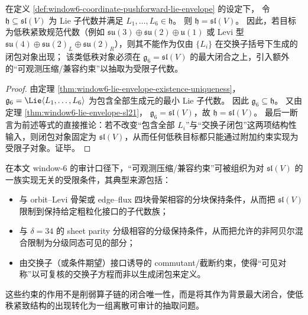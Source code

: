 \begin{proposition}\label{prop:window6-lowrank-needs-observable-compression}
在定义 \ref{def:window6-coordinate-pushforward-lie-envelope} 的设定下，
令 \(\mathfrak h\subseteq \mathfrak{sl}(V)\) 为 Lie 子代数并满足 \(L_1,\dots,L_6\in\mathfrak h\)。
则 \(\mathfrak h=\mathfrak{sl}(V)\)。
因此，若目标为低秩紧致规范代数（例如 \(\mathfrak{su}(3)\oplus\mathfrak{su}(2)\oplus\mathfrak u(1)\) 或 Levi 型 \(\mathfrak{su}(4)\oplus\mathfrak{su}(2)_L\oplus\mathfrak{su}(2)_R\)），则其不能作为仅由 \(\{L_i\}\) 在交换子括号下生成的闭包对象出现；
该类低秩对象必须在 \(\mathfrak g_6=\mathfrak{sl}(V)\) 的最大闭合之上，引入额外的“可观测压缩/兼容约束”以抽取为受限子代数。
\end{proposition}
\begin{proof}
由定理 \ref{thm:window6-lie-envelope-existence-uniqueness}，
\(\mathfrak g_6=\Lie\langle L_1,\dots,L_6\rangle\) 为包含全部生成元的最小 Lie 子代数。
因此 \(\mathfrak g_6\subseteq \mathfrak h\)。
又由定理 \ref{thm:window6-lie-envelope-sl21}，
\(\mathfrak g_6=\mathfrak{sl}(V)\)，故 \(\mathfrak h=\mathfrak{sl}(V)\)。
最后一断言为前述等式的直接推论：若不改变“包含全部 \(L_i\)”与“交换子闭包”这两项结构性输入，则闭包对象固定为 \(\mathfrak{sl}(V)\)，从而任何低秩目标都只能通过附加约束实现为受限子对象。证毕。
\end{proof}

\begin{remark}\label{rem:window6-observable-compression-forms}
在本文 window-\(6\) 的审计口径下，“可观测压缩/兼容约束”可被组织为对 \(\mathfrak{sl}(V)\) 的一族实现无关的受限条件，其典型来源包括：
\begin{itemize}
  \item 与 orbit--Levi 骨架或 edge--flux 四块骨架相容的分块保持条件，从而把 \(\mathfrak{sl}(V)\) 限制到保持给定粗粒化接口的子代数族；
  \item 与 \(\delta=34\) 的 sheet parity 分级相容的分级保持条件，从而把允许的非阿贝尔混合限制为分级同态可见的部分；
  \item 由交换子（或条件期望）接口诱导的 commutant/截断约束，使得“可见对称”以可复核的交换子方程而非以生成闭包来定义。
\end{itemize}
这些约束的作用不是削弱算子链的闭合唯一性，而是将其作为背景最大闭合，使低秩紧致结构的出现转化为一组离散可审计的抽取问题。
\end{remark}

